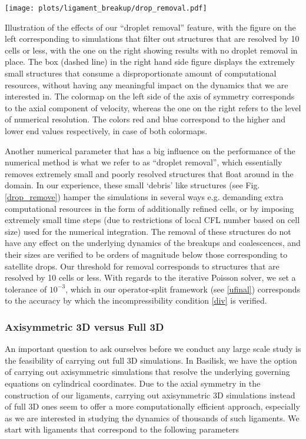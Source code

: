 \begin{marginfigure}[-6cm]
\centering
\texttt{[image: plots/ligament\_breakup/drop\_removal.pdf]}
	\caption{Illustration of the effects of our ``droplet removal'' feature, 
	with the figure on the left corresponding to simulations that filter out
	structures that are resolved by 10 cells or less, with the one on the right
	showing results with no droplet removal in place. The box (dashed line) in the 
	right hand side figure displays the extremely small structures that consume 
	a disproportionate amount of computational resources, without having any meaningful
	impact on the dynamics that we are interested in. 
	The colormap on the left side of the axis of 
	symmetry corresponds to the axial component of velocity, whereas the one on the right refers
	to the level of numerical resolution. The colors red and blue correspond to the higher 
	and lower end values respectively, in case of both colormaps. 
	}
\label{drop_remove}
\end{marginfigure}

Another numerical parameter that has a big influence on the performance of 
the numerical method is what we refer to as ``droplet removal'', 
which essentially removes extremely small and poorly 
resolved structures that float around in the domain. 
In our experience, these small `debris' like structures (see Fig. \ref{drop_remove})
hamper the simulations in several ways e.g. demanding extra computational 
resources in the form of additionally refined cells, 
or by imposing extremely small time steps (due to restrictions of 
local CFL number based on cell size) used for the numerical integration. 
The removal of these structures do not have any effect on the 
underlying dynamics of the breakups and coalescences, and their sizes 
are verified to be orders of magnitude below those corresponding to satellite drops. 
Our threshold for removal corresponds to structures that are resolved by 10 cells or less. 
With regards to the iterative Poisson solver, we set a tolerance of $10^{-3}$, which in our
operator-split framework (see \eqref{ufinal}) corresponds to the 
accuracy by which the incompressibility condition \eqref{div} is verified. 

\subsubsection*{Axisymmetric 3D versus Full 3D}

An important question to ask ourselves before we conduct any large scale
study is the feasibility of carrying out full 3D simulations. 
In Basilisk, we have the option of carrying out axisymmetric simulations
that resolve the underlying governing equations on cylindrical coordinates. 
Due to the axial symmetry in the construction of our ligaments, carrying 
out axisymmetric 3D simulations instead of full 3D ones seem to offer a more 
computationally efficient approach, especially as we are interested in studying
the dynamics of thousands of such ligaments. 
We start with ligaments that correspond to the following parameters

